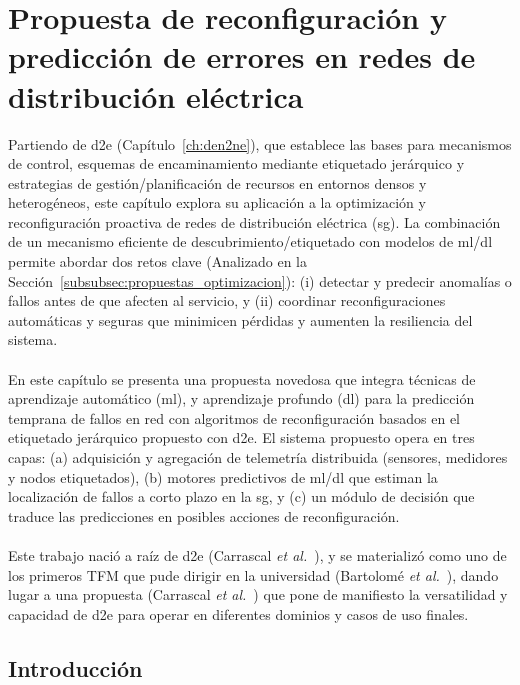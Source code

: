 \chapter{Propuesta de reconfiguración y predicción de errores en redes de distribución eléctrica}
\label{ch:fault_sg}

Partiendo de \gls{d2e} (Capítulo~\ref{ch:den2ne}), que establece las bases para mecanismos de control, esquemas de encaminamiento mediante etiquetado jerárquico y estrategias de gestión/planificación de recursos en entornos densos y heterogéneos, este capítulo explora su aplicación a la optimización y reconfiguración proactiva de redes de distribución eléctrica (\gls{sg}). La combinación de un mecanismo eficiente de descubrimiento/etiquetado con modelos de \gls{ml}/\gls{dl} permite abordar dos retos clave (Analizado en la Sección~\ref{subsubsec:propuestas_optimizacion}): (i) detectar y predecir anomalías o fallos antes de que afecten al servicio, y (ii) coordinar reconfiguraciones automáticas y seguras que minimicen pérdidas y aumenten la resiliencia del sistema.\\
\\
En este capítulo se presenta una propuesta novedosa que integra técnicas de aprendizaje automático (\gls{ml}), y aprendizaje profundo (\gls{dl}) para la predicción temprana de fallos en red con algoritmos de reconfiguración basados en el etiquetado jerárquico propuesto con \gls{d2e}. El sistema propuesto opera en tres capas: (a) adquisición y agregación de telemetría distribuida (sensores, medidores y nodos etiquetados), (b) motores predictivos de \gls{ml}/\gls{dl} que estiman la localización de fallos a corto plazo en la \gls{sg}, y (c) un módulo de decisión que traduce las predicciones en posibles acciones de reconfiguración.\\
\\
Este trabajo nació a raíz de \gls{d2e} (Carrascal \textit{et al.}~\cite{carrascal2024topology}), y se materializó como uno de los primeros TFM que pude dirigir en la universidad (Bartolomé \textit{et al.}~\cite{bartolome2024_smartgrids}), dando lugar a una propuesta (Carrascal \textit{et al.}~\cite{carrascal2024fault}) que pone de manifiesto la versatilidad y capacidad de \gls{d2e} para operar en diferentes dominios y casos de uso finales.

\section{Introducción}

